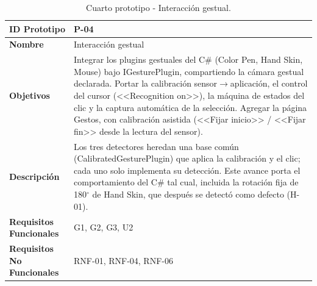 \begin{table}[H]
\centering
\caption{Cuarto prototipo - Interacción gestual.}
\label{tab:prototipo-p04}
\small
\begin{tabularx}{\textwidth}{>{\bfseries}l X}
\toprule
ID Prototipo & P-04 \\ \midrule
Nombre & Interacción gestual \\ \midrule
Objetivos & Integrar los plugins gestuales del C\# (Color Pen, Hand Skin, Mouse) bajo IGesturePlugin, compartiendo la cámara gestual declarada. \newline Portar la calibración sensor$\rightarrow$aplicación, el control del cursor (<<Recognition on>>), la máquina de estados del clic y la captura automática de la selección. \newline Agregar la página Gestos, con calibración asistida (<<Fijar inicio>> / <<Fijar fin>> desde la lectura del sensor). \\ \midrule
Descripción & Los tres detectores heredan una base común (CalibratedGesturePlugin) que aplica la calibración y el clic; cada uno solo implementa su detección. Este avance porta el comportamiento del C\# tal cual, incluida la rotación fija de 180$^{\circ}$ de Hand Skin, que después se detectó como defecto (H-01). \\ \midrule
Requisitos Funcionales & G1, G2, G3, U2 \\ \midrule
Requisitos No Funcionales & RNF-01, RNF-04, RNF-06 \\ \bottomrule
\end{tabularx}
\end{table}
